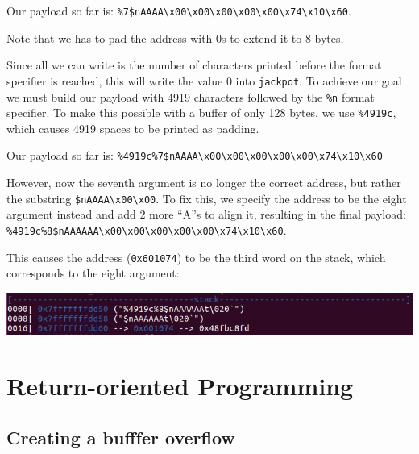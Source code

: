 \documentclass[12pt]{article}
\begin{document}
Our payload so far is: \texttt{\%7\$nAAAA\textbackslash{}x00\textbackslash{}x00\textbackslash{}x00\textbackslash{}x00\textbackslash{}x00\textbackslash{}x74\textbackslash{}x10\textbackslash{}x60}.

Note that we has to pad the address with 0s to extend it to 8 bytes.

Since all we can write is the number of characters printed before the format specifier is reached, this will write the value 0 into \texttt{jackpot}. To achieve our goal we must build our payload with 4919 characters followed by the \texttt{\%n} format specifier. To make this possible with a buffer of only 128 bytes, we use \texttt{\%4919c}, which causes 4919 spaces to be printed as padding.

Our payload so far is: \texttt{\%4919c\%7\$nAAAA\textbackslash{}x00\textbackslash{}x00\textbackslash{}x00\textbackslash{}x00\textbackslash{}x00\textbackslash{}x74\textbackslash{}x10\textbackslash{}x60}

However, now the seventh argument is no longer the correct address, but rather the substring \texttt{\$nAAAA\textbackslash{}x00\textbackslash{}x00}. To fix this, we specify the address to be the eight argument instead and add 2 more ``A''s to align it, resulting in the final payload: \texttt{\%4919c\%8\$nAAAAAA\textbackslash{}x00\textbackslash{}x00\textbackslash{}x00\textbackslash{}x00\textbackslash{}x00\textbackslash{}x74\textbackslash{}x10\textbackslash{}x60}.

This causes the address (\texttt{0x601074}) to be the third word on the stack, which corresponds to the eight argument:

\begin{center}
    \includegraphics[scale=0.9]{ex2-stack.jpg}
\end{center}




\newpage
\section{Return-oriented Programming}

\subsection{Creating a bufffer overflow}
\end{document}
